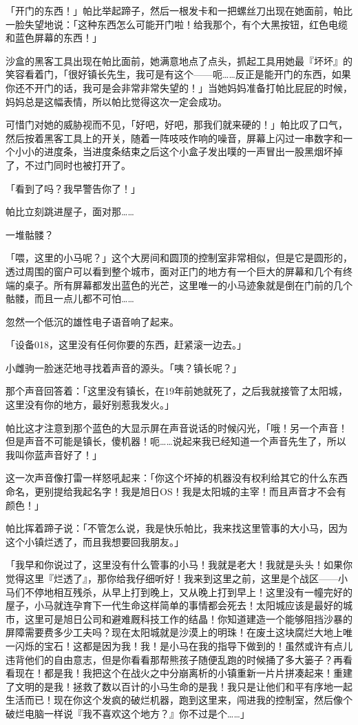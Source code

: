 「开门的东西！」帕比举起蹄子，然后一根发卡和一把螺丝刀出现在她面前，帕比一脸失望地说：「这种东西怎么可能开门啦！给我那个，有个大黑按钮，红色电缆和蓝色屏幕的东西！」

沙盒的黑客工具出现在帕比面前，她满意地点了点头，抓起工具用她最『坏坏』的笑容看着门，「很好镇长先生，我可是有这个——呃……反正是能开门的东西，如果你还不开门的话，我可是会非常非常失望的！」当她妈妈准备打帕比屁屁的时候，妈妈总是这幅表情，所以帕比觉得这次一定会成功。

可惜门对她的威胁视而不见，「好吧，好吧，那我们就来硬的！」帕比叹了口气，然后按着黑客工具上的开关，随着一阵吱吱作响的噪音，屏幕上闪过一串数字和一个小小的进度条，当进度条结束之后这个小盒子发出噗的一声冒出一股黑烟坏掉了，不过门同时也被打开了。

「看到了吗？我早警告你了！」

帕比立刻跳进屋子，面对那……

一堆骷髅？

「喂，这里的小马呢？」这个大房间和圆顶的控制室非常相似，但是它是圆形的，透过周围的窗户可以看到整个城市，面对正门的地方有一个巨大的屏幕和几个有终端的桌子。所有屏幕都发出蓝色的光芒，这里唯一的小马迹象就是倒在门前的几个骷髅，而且一点儿都不可怕……

忽然一个低沉的雄性电子语音响了起来。

「设备018，这里没有任何你要的东西，赶紧滚一边去。」

小雌驹一脸迷茫地寻找着声音的源头。「咦？镇长呢？」

那个声音回答着：「这里没有镇长，在19年前她就死了，之后我就接管了太阳城，这里没有你的地方，最好别惹我发火。」

帕比这才注意到那个蓝色的大显示屏在声音说话的时候闪光，「哦！另一个声音！但是声音不可能是镇长，傻机器！呃……说起来我已经知道一个声音先生了，所以我叫你蓝声音好了！」

这一次声音像打雷一样怒吼起来：「你这个坏掉的机器没有权利给其它的什么东西命名，更别提给我起名字！我是旭日OS！我是太阳城的主宰！而且声音才不会有颜色！」

帕比挥着蹄子说：「不管怎么说，我是快乐帕比，我来找这里管事的大小马，因为这个小镇烂透了，而且我想要回我朋友。」

「我早和你说过了，这里没有什么管事的小马！我就是老大！我就是头头！如果你觉得这里『烂透了』，那你给我仔细听好！我来到这里之前，这里是个战区——小马们不停地相互残杀，从早上打到晚上，又从晚上打到早上！这里没有一幢完好的屋子，小马就连孕育下一代生命这样简单的事情都会死去！太阳城应该是最好的城市，这里可是旭日公司和避难厩科技工作的结晶！你知道建造一个能够阻挡沙暴的屏障需要费多少工夫吗？现在太阳城就是沙漠上的明珠！在废土这块腐烂大地上唯一闪烁的宝石！这都是因为我！我！是小马在我的指导下做到的！虽然或许有点儿违背他们的自由意志，但是你看看那帮熊孩子随便乱跑的时候捅了多大篓子？再看看现在！都是我！我把这个在战火之中分崩离析的小镇重新一片片拼凑起来！重建了文明的是我！拯救了数以百计的小马生命的是我！我只是让他们和平有序地一起生活而已！现在你这个发疯的破烂机器，跑到这里来，闯进我的控制室，然后像个破烂电脑一样说『我不喜欢这个地方？』你不过是个……」

